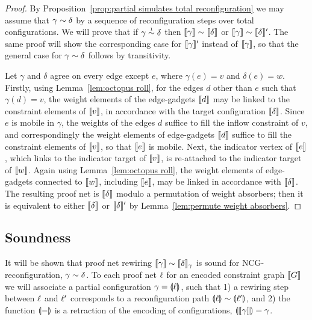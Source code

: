 \documentclass{lmcs}
\let\capsabbrev=\uppercase
\begin{document}
\begin{proof}
By Proposition~\ref{prop:partial simulates total reconfiguration} we may assume that $\gamma\perm\delta$ by a sequence of reconfiguration steps over total configurations.
%
We will prove that if $\gamma\perm*\delta$ then $\itn\gamma\perm\itn\delta$ or $\itn\gamma\perm\itn\delta'$.
%
The same proof will show the corresponding case for $\llbracket\gamma\rrbracket'$ instead of $\llbracket\gamma\rrbracket$, so that the general case for $\gamma\perm\delta$ follows by transitivity.



Let $\gamma$ and $\delta$ agree on every edge except $e$, where $\gamma(e)=v$ and $\delta(e)=w$.
%
Firstly, using Lemma~\ref{lem:octopus roll}, for the edges $d$ other than $e$ such that $\gamma(d)=v$, the weight elements of the edge-gadgets $\llbracket d\rrbracket$ may be linked to the constraint elements of $\llbracket v\rrbracket$, in accordance with the target configuration $\llbracket\delta\rrbracket$.
%
Since $e$ is mobile in $\gamma$, the weights of the edges $d$ suffice to fill the inflow constraint of $v$, and correspondingly the weight elements of edge-gadgets $\llbracket d\rrbracket$ suffice to fill the constraint elements of $\llbracket v\rrbracket$, so that $\llbracket e\rrbracket$ is mobile.
%
Next, the indicator vertex of $\llbracket e\rrbracket$, which links to the indicator target of $\llbracket v\rrbracket$, is re-attached to the indicator target of $\llbracket w\rrbracket$.
%
Again using Lemma~\ref{lem:octopus roll}, the weight elements of edge-gadgets connected to $\llbracket w\rrbracket$, including $\llbracket e\rrbracket$, may be linked in accordance with $\llbracket\delta\rrbracket$.
%
The resulting proof net is $\llbracket\delta\rrbracket$ modulo a permutation of weight absorbers; then it is equivalent to either $\llbracket\delta\rrbracket$ or $\llbracket\delta\rrbracket'$ by Lemma~\ref{lem:permute weight absorbers}.
\end{proof}



\subsection*{Soundness}


It will be shown that proof net rewiring $\itn\gamma\perm\itn\delta_\gamma$ is sound for \capsabbrev{ncg}-reconfiguration, $\gamma\perm\delta$.
%
To each proof net $\ell$ for an encoded constraint graph $\llbracket G\rrbracket$ we will associate a partial configuration $\gamma=\llparenthesis\ell\rrparenthesis$, such that 1) a rewiring step between $\ell$ and $\ell'$ corresponds to a reconfiguration path $\coitn\links\perm\coitn{\links'}$, and 2) the function $\llparenthesis-\rrparenthesis$ is a retraction of the encoding of configurations, $\llparenthesis\llbracket\gamma\rrbracket\rrparenthesis=\gamma$.
\end{document}
